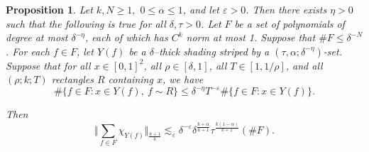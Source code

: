 \documentclass[letterpaper, reqno,11pt]{article}
\numberwithin{equation}{section}
\newcommand{\eps}{\varepsilon}
\numberwithin{thm}{section}
\newtheorem{prop}[thm]{Proposition}
\theoremstyle{remark}
\begin{document}
\begin{prop}\label{maximalFnBdNonconcentrated}
Let $k,N\geq 1,$ $0\leq \alpha\leq 1$, and let $\eps>0$. Then there exists $\eta>0$ such that the following is true for all $\delta,\tau>0$. Let $F$ be a set of polynomials of degree at most $\delta^{-\eta}$, each of which has $C^{k}$ norm at most 1. Suppose that $\#F\leq\delta^{-N}$. For each $f\in F$, let $Y(f)$ be a $\delta$--thick shading striped by a $(\tau,\alpha;\delta^{-\eta})$-set. Suppose that for all $x\in [0,1]^2$, all $\rho\in[\delta,1]$, all $T\in [1, 1/\rho]$, and all $(\rho; k; T)$ rectangles $R$ containing $x$, we have
%
\begin{equation}\label{rectangleConcentrationBdNonconcentratedProp}
\#\{f\in F\colon x\in Y(f),\ f\sim R\} \leq \delta^{-\eta}T^{-\eps}\#\{f\in F\colon x\in Y(f)\}.
\end{equation}
%

Then
\begin{equation}\label{NonconcentratedPropLpBound}
\Big \Vert \sum_{f\in F}\chi_{Y(f)}\Big\Vert_{\frac{k+1}{k}}\lesssim_\eps  \delta^{-\eps}\delta^{\frac{k+\alpha}{k+1}}\tau^{\frac{k(1-\alpha)}{k+1}}
(\#F).
\end{equation}
\end{prop}
\end{document}
